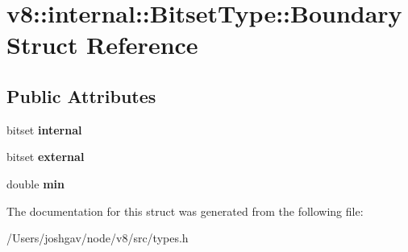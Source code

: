 \hypertarget{structv8_1_1internal_1_1_bitset_type_1_1_boundary}{}\section{v8\+:\+:internal\+:\+:Bitset\+Type\+:\+:Boundary Struct Reference}
\label{structv8_1_1internal_1_1_bitset_type_1_1_boundary}
\subsection*{Public Attributes}
\begin{DoxyCompactItemize}
\item 
bitset {\bfseries internal}\hypertarget{structv8_1_1internal_1_1_bitset_type_1_1_boundary_ad9fa61b5afb3862392587d0ed1307054}{}\label{structv8_1_1internal_1_1_bitset_type_1_1_boundary_ad9fa61b5afb3862392587d0ed1307054}

\item 
bitset {\bfseries external}\hypertarget{structv8_1_1internal_1_1_bitset_type_1_1_boundary_a33cde7fb654b6cc66fd766a9ffd7558c}{}\label{structv8_1_1internal_1_1_bitset_type_1_1_boundary_a33cde7fb654b6cc66fd766a9ffd7558c}

\item 
double {\bfseries min}\hypertarget{structv8_1_1internal_1_1_bitset_type_1_1_boundary_a99f096f425de89d13770e04b7b46de0a}{}\label{structv8_1_1internal_1_1_bitset_type_1_1_boundary_a99f096f425de89d13770e04b7b46de0a}

\end{DoxyCompactItemize}


The documentation for this struct was generated from the following file\+:\begin{DoxyCompactItemize}
\item 
/\+Users/joshgav/node/v8/src/types.\+h\end{DoxyCompactItemize}
